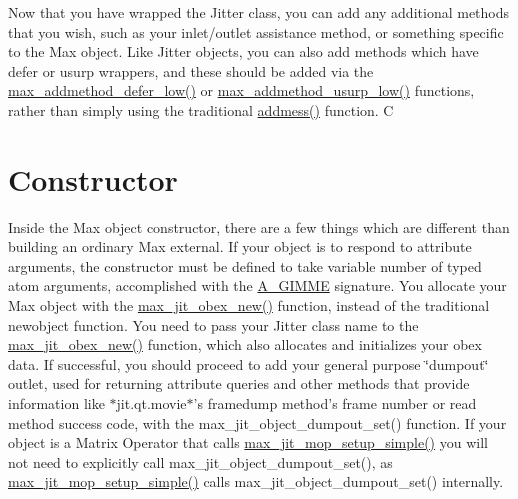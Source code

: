 Now that you have wrapped the Jitter class, you can add any additional methods that you wish, such as your inlet/outlet assistance method, or something specific to the Max object. Like Jitter objects, you can also add methods which have defer or usurp wrappers, and these should be added via the \hyperlink{group__maxwrapmod_gac057d2e8d94686363fa9ae8ea0b41fee}{max\_\-addmethod\_\-defer\_\-low()} or \hyperlink{group__maxwrapmod_ga2c596151798123076dcd1d4f7d76e203}{max\_\-addmethod\_\-usurp\_\-low()} functions, rather than simply using the traditional \hyperlink{group__class__old_ga0d9bfa416fdd861d1b2fd2d17701cbb3}{addmess()} function. C\hypertarget{chapter_jit_maxwrappers_chapter_jit_maxwrappers_ctor}{}\section{Constructor}\label{chapter_jit_maxwrappers_chapter_jit_maxwrappers_ctor}
Inside the Max object constructor, there are a few things which are different than building an ordinary Max external. If your object is to respond to attribute arguments, the constructor must be defined to take variable number of typed atom arguments, accomplished with the \hyperlink{group__atom_gga8aa6700e9f00b132eb376db6e39ade47a81c1a8550f038db16a619167a70a79b6}{A\_\-GIMME} signature. You allocate your Max object with the \hyperlink{group__maxwrapmod_gacf7fc6f3f87db8515f61b12efbcc9073}{max\_\-jit\_\-obex\_\-new()} function, instead of the traditional newobject function. You need to pass your Jitter class name to the \hyperlink{group__maxwrapmod_gacf7fc6f3f87db8515f61b12efbcc9073}{max\_\-jit\_\-obex\_\-new()} function, which also allocates and initializes your obex data. If successful, you should proceed to add your general purpose \char`\"{}dumpout\char`\"{} outlet, used for returning attribute queries and other methods that provide information like $\ast$jit.qt.movie$\ast$'s framedump method's frame number or read method success code, with the max\_\-jit\_\-object\_\-dumpout\_\-set() function. If your object is a Matrix Operator that calls \hyperlink{group__maxmopmod_gac3eaca207281516b72e81f0dc5f4bf94}{max\_\-jit\_\-mop\_\-setup\_\-simple()} you will not need to explicitly call max\_\-jit\_\-object\_\-dumpout\_\-set(), as \hyperlink{group__maxmopmod_gac3eaca207281516b72e81f0dc5f4bf94}{max\_\-jit\_\-mop\_\-setup\_\-simple()} calls max\_\-jit\_\-object\_\-dumpout\_\-set() internally.

